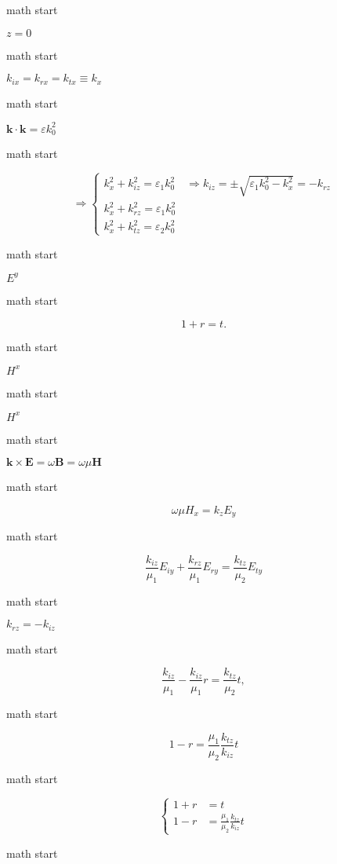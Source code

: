 math start

\(z=0\)

math start

\(k_{i x}=k_{r x}=k_{t x} \equiv k_{x}\)

math start

\(\mathbf{k} \cdot \mathbf{k}=\varepsilon k_{0}^{2}\)

math start

\[\Rightarrow \left\{\begin{array}{l}
k_{x}^{2}+k_{i z}^{2}=\varepsilon_{1} k_{0}^{2} \quad \Rightarrow k_{i z}=\pm \sqrt{\varepsilon_{1} k_{0}^{2}-k_{x}^{2}}=-k_{r z} \\
k_{x}^{2}+k_{r z}^{2}=\varepsilon_{1} k_{0}^{2} \\
k_{x}^{2}+k_{t z}^{2}=\varepsilon_{2} k_{0}^{2}
\end{array}\right.\]

math start

\(E^y\)

math start

\[1+r =t.\]

math start

\(H^x\)

math start

\(H^x\)

math start

\(\mathbf{k}\times\mathbf{E}= \omega\mathbf{B}= \omega\mu\mathbf{H}\)

math start

\[\omega\mu H_x = k_z E_y\]

math start

\[\frac{k_{iz}}{\mu_1}E_{iy} + \frac{k_{rz}}{\mu_1}E_{ry} = \frac{k_{tz}}{\mu_2}E_{ty}\]

math start

\(k_{rz} = -k_{iz}\)

math start

\[\frac{k_{iz}}{\mu_1} - \frac{k_{iz}}{\mu_1}r = \frac{k_{tz}}{\mu_2}t,\]

math start

\[1 - r = \frac{\mu_1}{\mu_2}\frac{k_{tz}}{k_{iz}}t\]

math start

\[\left\{
\begin{aligned}
1 + r &= t\\
1 - r &= \frac{\mu_1}{\mu_2}\frac{k_{tz}}{k_{iz}}t
\end{aligned}\right.\]

math start

